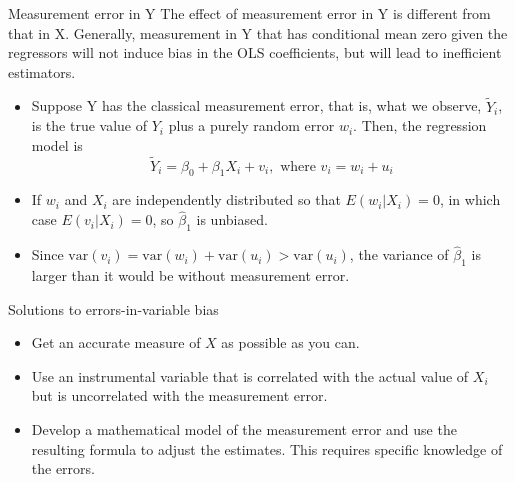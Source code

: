 \documentclass[presentation,10pt]{beamer}
\newcommand{\var}{\mathrm{var}}
\begin{document}
\begin{frame}[label={sec:orgab50e81}]{Measurement error in Y}
The effect of measurement error in Y is different from that in
X. Generally, measurement in Y that has conditional mean zero given
the regressors will not induce bias in the OLS coefficients, but will
lead to inefficient estimators. 

\begin{itemize}
\item Suppose Y has the classical measurement error, that is, what we
observe, \(\tilde{Y}_i\), is the true value of \(Y_i\) plus a purely
random error \(w_i\). Then, the regression model is 
\[ \tilde{Y}_i = \beta_0 + \beta_1 X_i + v_i, \text{ where } v_i = w_i +
  u_i\]
\item If \(w_i\) and \(X_i\) are independently distributed so that \(E(w_i | X_i)
  = 0\), in which case \(E(v_i | X_i) = 0\), so \(\hat{\beta}_1\) is
unbiased.
\item Since \(\var(v_i) = \var(w_i) + \var(u_i) > \var(u_i)\), the variance
of \(\hat{\beta}_1\) is larger than it would be without measurement
error.
\end{itemize}
\end{frame}

\begin{frame}[label={sec:org4c7891f}]{Solutions to errors-in-variable bias}
\begin{itemize}
\item Get an accurate measure of \(X\) as possible as you can.
\item Use an instrumental variable that is correlated with the actual
value of \(X_i\) but is uncorrelated with the measurement error.
\item Develop a mathematical model of the measurement error and use the
resulting formula to adjust the estimates. This requires specific
knowledge of the errors.
\end{itemize}
\end{frame}
\end{document}
